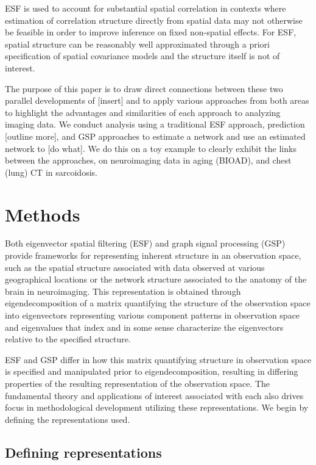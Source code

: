 \documentclass[12pt]{article}
\begin{document}
ESF is used to account for substantial spatial correlation in contexts where estimation of correlation structure directly from spatial data may not otherwise be feasible in order to improve inference on fixed non-spatial effects. For ESF, spatial structure can be reasonably well approximated through a priori specification of spatial covariance models and the structure itself is not of interest.

The purpose of this paper is to draw direct connections between these two parallel developments of [insert] and to apply various approaches from both areas to highlight the advantages and similarities of each approach to analyzing imaging data. We conduct analysis using a traditional ESF approach, prediction [outline more], and GSP approaches to estimate a network and use an estimated network to [do what]. We do this on a toy example to clearly exhibit the links between the approaches, on neuroimaging data in aging (BIOAD), and chest (lung) CT in sarcoidosis.

\section{Methods}

Both eigenvector spatial filtering (ESF) and graph signal processing (GSP) provide frameworks for representing inherent structure in an observation space, such as the spatial structure associated with data observed at various geographical locations or the network structure associated to the anatomy of the brain in neuroimaging. This representation is obtained through eigendecomposition of a matrix quantifying the structure of the observation space into eigenvectors representing various component patterns in observation space and eigenvalues that index and in some sense characterize the eigenvectors relative to the specified structure. 

ESF and GSP differ in how this matrix quantifying structure in observation space is specified and manipulated prior to eigendecomposition, resulting in differing properties of the resulting representation of the observation space. The fundamental theory and applications of interest associated with each also drives focus in methodological development utilizing these representations. We begin by defining the representations used.

\subsection{Defining representations}
\end{document}
